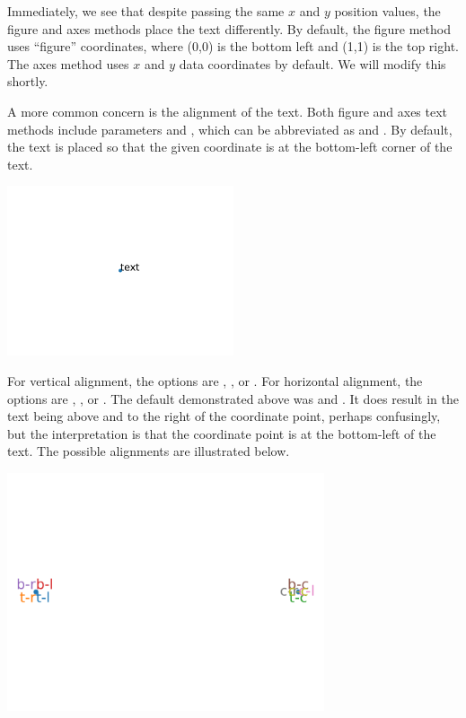 Immediately, we see that despite passing the same $x$ and $y$ position values, the figure and axes methods place the text differently. By default, the figure method uses ``figure'' coordinates, where (0,0) is the bottom left and (1,1) is the top right. The axes method uses $x$ and $y$ data coordinates by default. We will modify this shortly. 

A more common concern is the alignment of the text. Both figure and axes text methods include parameters  and , which can be abbreviated as  and . By default, the text is placed so that the given coordinate is at the bottom-left corner of the text. 


\begin{center}
    \includegraphics[width = 0.5\textwidth]{figures/proseplots/text-default-align.pdf}
\end{center}

\noindent For vertical alignment, the options are , , or . For horizontal alignment, the options are , , or . The default demonstrated above was  and . It does result in the text being above and to the right of the coordinate point, perhaps confusingly, but the interpretation is that the coordinate point is at the bottom-left of the text. The possible alignments are illustrated below. 


\begin{center}
    \includegraphics[width = 0.7\textwidth]{figures/proseplots/text-align.pdf}
\end{center}


